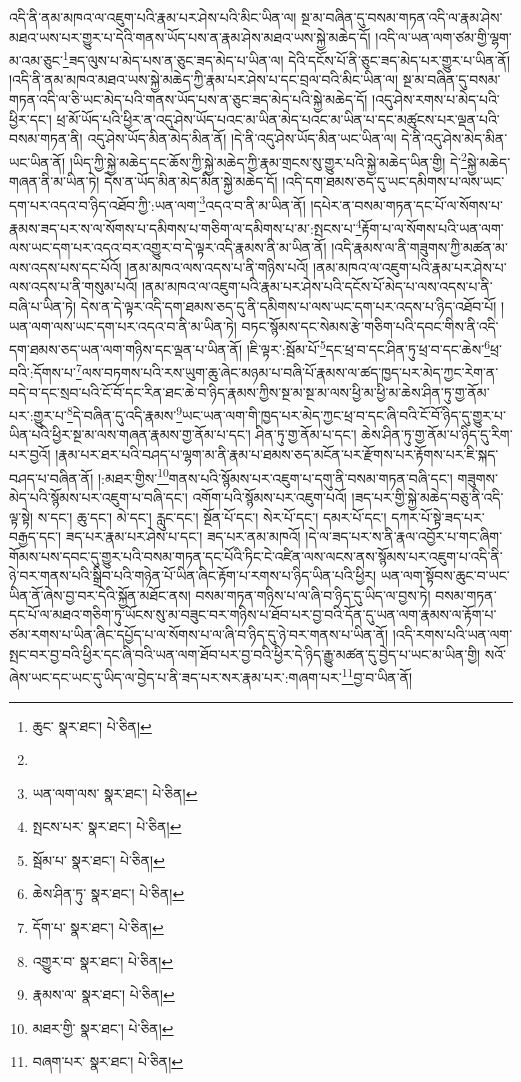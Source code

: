འདི་ནི་ནམ་མཁའ་ལ་འཇུག་པའི་རྣམ་པར་ཤེས་པའི་མིང་ཡིན་ལ། སྔ་མ་བཞིན་དུ་བསམ་གཏན་འདི་ལ་རྣམ་ཤེས་མཐའ་ཡས་པར་གྱུར་པ་དེའི་གནས་ཡོད་པས་ན་རྣམ་ཤེས་མཐའ་ཡས་སྐྱེ་མཆེད་དོ། །འདི་ལ་ཡན་ལག་ཙམ་གྱི་ལྷག་མ་འམ་ཅུང་\footnote{ཆུང་  སྣར་ཐང་།  པེ་ཅིན། }ཟད་ལུས་པ་མེད་པས་ན་ཅུང་ཟད་མེད་པ་ཡིན་ལ། དེའི་དངོས་པོ་ནི་ཅུང་ཟད་མེད་པར་གྱུར་པ་ཡིན་ནོ། །འདི་ནི་ནམ་མཁའ་མཐའ་ཡས་སྐྱེ་མཆེད་ཀྱི་རྣམ་པར་ཤེས་པ་དང་བྲལ་བའི་མིང་ཡིན་ལ། སྔ་མ་བཞིན་དུ་བསམ་གཏན་འདི་ལ་ཅི་ཡང་མེད་པའི་གནས་ཡོད་པས་ན་ཅུང་ཟད་མེད་པའི་སྐྱེ་མཆེད་དོ། །འདུ་ཤེས་རགས་པ་མེད་པའི་ཕྱིར་དང་། ཕྲ་མོ་ཡོད་པའི་ཕྱིར་ན་འདུ་ཤེས་ཡོད་པའང་མ་ཡིན་མེད་པའང་མ་ཡིན་པ་དང་མཚུངས་པར་ལྡན་པའི་བསམ་གཏན་ནི། འདུ་ཤེས་ཡོད་མིན་མེད་མིན་ནོ། །དེ་ནི་འདུ་ཤེས་ཡོད་མིན་ཡང་ཡིན་ལ། དེ་ནི་འདུ་ཤེས་མེད་མིན་ཡང་ཡིན་ནོ། །ཡིད་ཀྱི་སྐྱེ་མཆེད་དང་ཆོས་ཀྱི་སྐྱེ་མཆེད་ཀྱི་རྣམ་གྲངས་སུ་གྱུར་པའི་སྐྱེ་མཆེད་ཡིན་གྱི། དེ་\footnote{}སྐྱེ་མཆེད་གཞན་ནི་མ་ཡིན་ཏེ། དེས་ན་ཡོད་མིན་མེད་མིན་སྐྱེ་མཆེད་དོ། །འདི་དག་ཐམས་ཅད་དུ་ཡང་དམིགས་པ་ལས་ཡང་དག་པར་འདའ་བ་ཉིད་འཐོབ་ཀྱི་:ཡན་ལག་\footnote{ཡན་ལག་ལས་  སྣར་ཐང་།  པེ་ཅིན། }འདའ་བ་ནི་མ་ཡིན་ནོ། །དཔེར་ན་བསམ་གཏན་དང་པོ་ལ་སོགས་པ་རྣམས་ཟད་པར་ས་ལ་སོགས་པ་དམིགས་པ་གཅིག་ལ་དམིགས་པ་མ་:སྤངས་པ་\footnote{སྤངས་པར་  སྣར་ཐང་།  པེ་ཅིན། }རྟོག་པ་ལ་སོགས་པའི་ཡན་ལག་ལས་ཡང་དག་པར་འདའ་བར་འགྱུར་བ་དེ་ལྟར་འདི་རྣམས་ནི་མ་ཡིན་ནོ། །འདི་རྣམས་ལ་ནི་གཟུགས་ཀྱི་མཚན་མ་ལས་འདས་པས་དང་པོའོ། །ནམ་མཁའ་ལས་འདས་པ་ནི་གཉིས་པའོ། །ནམ་མཁའ་ལ་འཇུག་པའི་རྣམ་པར་ཤེས་པ་ལས་འདས་པ་ནི་གསུམ་པའོ། །ནམ་མཁའ་ལ་འཇུག་པའི་རྣམ་པར་ཤེས་པའི་དངོས་པོ་མེད་པ་ལས་འདས་པ་ནི་བཞི་པ་ཡིན་ཏེ། དེས་ན་དེ་ལྟར་འདི་དག་ཐམས་ཅད་དུ་ནི་དམིགས་པ་ལས་ཡང་དག་པར་འདས་པ་ཉིད་འཐོབ་པོ། །ཡན་ལག་ལས་ཡང་དག་པར་འདའ་བ་ནི་མ་ཡིན་ཏེ། བཏང་སྙོམས་དང་སེམས་རྩེ་གཅིག་པའི་དབང་གིས་ནི་འདི་དག་ཐམས་ཅད་ཡན་ལག་གཉིས་དང་ལྡན་པ་ཡིན་ནོ། །ཇི་ལྟར་:སྦོམ་པོ་\footnote{སྦོམ་པ་  སྣར་ཐང་།  པེ་ཅིན། }དང་ཕྲ་བ་དང་ཤིན་ཏུ་ཕྲ་བ་དང་ཆེས་\footnote{ཆེས་ཤིན་ཏུ་  སྣར་ཐང་།  པེ་ཅིན། }ཕྲ་བའི་:དོགས་པ་\footnote{དོག་པ་  སྣར་ཐང་།  པེ་ཅིན། }ལས་བཏགས་པའི་རས་ཡུག་ཆུ་ཞེང་མཉམ་པ་བཞི་པོ་རྣམས་ལ་ཚད་ཁྱད་པར་མེད་ཀྱང་རེག་ན་བདེ་བ་དང་སྲབ་པའི་ངོ་བོ་དང་རིན་ཐང་ཆེ་བ་ཉིད་རྣམས་ཀྱིས་སྔ་མ་སྔ་མ་ལས་ཕྱི་མ་ཕྱི་མ་ཆེས་ཤིན་ཏུ་གྱ་ནོམ་པར་:གྱུར་པ་\footnote{འགྱུར་བ་  སྣར་ཐང་།  པེ་ཅིན། }དེ་བཞིན་དུ་འདི་རྣམས་\footnote{རྣམས་ལ་  སྣར་ཐང་།  པེ་ཅིན། }ཡང་ཡན་ལག་གི་ཁྱད་པར་མེད་ཀྱང་ཕྲ་བ་དང་ཞི་བའི་ངོ་བོ་ཉིད་དུ་གྱུར་པ་ཡིན་པའི་ཕྱིར་སྔ་མ་ལས་གཞན་རྣམས་གྱ་ནོམ་པ་དང་། ཤིན་ཏུ་གྱ་ནོམ་པ་དང་། ཆེས་ཤིན་ཏུ་གྱ་ནོམ་པ་ཉིད་དུ་རིག་པར་བྱའོ། །རྣམ་པར་ཐར་པའི་བཤད་པ་ལྷག་མ་ནི་རྣམ་པ་ཐམས་ཅད་མངོན་པར་རྫོགས་པར་རྟོགས་པར་ཇི་སྐད་བཤད་པ་བཞིན་ནོ། །:མཐར་གྱིས་\footnote{མཐར་གྱི་  སྣར་ཐང་།  པེ་ཅིན། }གནས་པའི་སྙོམས་པར་འཇུག་པ་དགུ་ནི་བསམ་གཏན་བཞི་དང་། གཟུགས་མེད་པའི་སྙོམས་པར་འཇུག་པ་བཞི་དང་། འགོག་པའི་སྙོམས་པར་འཇུག་པའོ། །ཟད་པར་གྱི་སྐྱེ་མཆེད་བཅུ་ནི་འདི་ལྟ་སྟེ། ས་དང་། ཆུ་དང་། མེ་དང་། རླུང་དང་། སྔོན་པོ་དང་། སེར་པོ་དང་། དམར་པོ་དང་། དཀར་པོ་སྟེ་ཟད་པར་བརྒྱད་དང་། ཟད་པར་རྣམ་པར་ཤེས་པ་དང་། ཟད་པར་ནམ་མཁའོ། །དེ་ལ་ཟད་པར་ས་ནི་རྣལ་འབྱོར་པ་གང་ཞིག་གོམས་པས་དབང་དུ་གྱུར་པའི་བསམ་གཏན་དང་པོའི་ཏིང་ངེ་འཛིན་ལས་ལངས་ནས་སྙོམས་པར་འཇུག་པ་འདི་ནི་ཉེ་བར་གནས་པའི་སྒྲིབ་པའི་གཉེན་པོ་ཡིན་ཞིང་རྟོག་པ་རགས་པ་ཉིད་ཡིན་པའི་ཕྱིར། ཡན་ལག་སྟོབས་ཆུང་བ་ཡང་ཡིན་ནོ་ཞེས་བྱ་བར་དེའི་སྐྱོན་མཐོང་ནས། བསམ་གཏན་གཉིས་པ་ལ་ཞི་བ་ཉིད་དུ་ཡིད་ལ་བྱས་ཏེ། བསམ་གཏན་དང་པོ་ལ་མཐའ་གཅིག་ཏུ་ཡོངས་སུ་མ་བཟུང་བར་གཉིས་པ་ཐོབ་པར་བྱ་བའི་དོན་དུ་ཡན་ལག་རྣམས་ལ་རྟོག་པ་ཙམ་རགས་པ་ཡིན་ཞིང་དཔྱོད་པ་ལ་སོགས་པ་ལ་ཞི་བ་ཉིད་དུ་ཉེ་བར་གནས་པ་ཡིན་ནོ། །འདི་རགས་པའི་ཡན་ལག་སྤང་བར་བྱ་བའི་ཕྱིར་དང་ཞི་བའི་ཡན་ལག་ཐོབ་པར་བྱ་བའི་ཕྱིར་དེ་ཉིད་རྒྱུ་མཚན་དུ་བྱེད་པ་ཡང་མ་ཡིན་གྱི། སའོ་ཞེས་ཡང་དང་ཡང་དུ་ཡིད་ལ་བྱེད་པ་ནི་ཟད་པར་སར་རྣམ་པར་:གཞག་པར་\footnote{བཞག་པར་  སྣར་ཐང་།  པེ་ཅིན། }བྱ་བ་ཡིན་ནོ། 